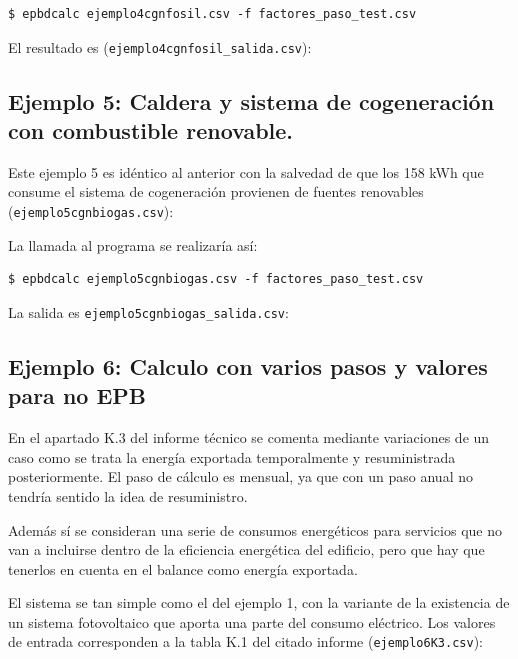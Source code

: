 \documentclass[10pt,notitlepage,oneside,a4paper]{article}
\begin{document}
\begin{Verbatim}[fontsize=\small]
    $ epbdcalc ejemplo4cgnfosil.csv -f factores_paso_test.csv
\end{Verbatim}

El resultado es (\texttt{ejemplo4cgnfosil\_salida.csv}):


\subsection{Ejemplo 5: Caldera y sistema de cogeneración con combustible renovable.}
Este ejemplo 5 es idéntico al anterior con la salvedad de que los 158 kWh que consume el sistema de cogeneración provienen de fuentes renovables (\texttt{ejemplo5cgnbiogas.csv}):


La llamada al programa se realizaría así:

\begin{Verbatim}[fontsize=\small]
    $ epbdcalc ejemplo5cgnbiogas.csv -f factores_paso_test.csv
\end{Verbatim}

La salida es \texttt{ejemplo5cgnbiogas\_salida.csv}:



\subsection{Ejemplo 6: Calculo con varios pasos y valores para no EPB}
En el apartado K.3 del informe técnico se comenta mediante variaciones de un caso como se trata la energía exportada temporalmente y resuministrada posteriormente. El paso de cálculo es mensual, ya que con un paso anual no tendría sentido la idea de resuministro.

Además sí se consideran una serie de consumos energéticos para servicios que no van a incluirse dentro de la eficiencia energética del edificio, pero que hay que tenerlos en cuenta en el balance como energía exportada. 

El sistema se tan simple como el del ejemplo 1, con la variante de la existencia de un sistema fotovoltaico que aporta una parte del consumo eléctrico. Los valores de entrada corresponden a la tabla K.1 del citado informe (\texttt{ejemplo6K3.csv}):
\end{document}
